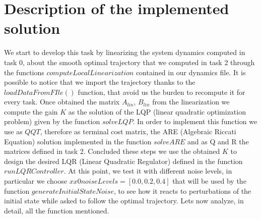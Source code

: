 \documentclass[a4paper,11pt,oneside]{book}
\begin{document}
\section{Description of the implemented solution}
\begin{justify}
    {We start to develop this task by linearizing the system dynamics computed in task 0, about the smooth optimal trajectory that we computed in task 2 through the functions $computeLocalLinearization$ contained in our dynamics file. It is possible to notice that we import the trajectory thanks to the $loadDataFromFIle()$ function, that avoid us the burden to recompute it for every task. Once obtained the matrix $A_{lin}$, $B_{lin}$ from the linearization we compute the gain $K$ as the solution of the LQP (linear quadratic optimization problem) given by the function $solveLQP$. In order to implement this function we use as $QQT$, therefore as terminal cost matrix, the ARE (Algebraic Riccati Equation) solution implemented in the function $solveARE$ and as Q and R the matrices defined in task 2. Concluded these steps we use the obtained $K$ to design the desired LQR (Linear Quadratic Regulator) defined in the function $runLQRController$. At this point, we test it with different noise levels, in particular we choose $xx0noiseLevels = [0.0, 0.2, 0.4]$ that will be used by the function $generateInitialStateNoise$, to see how it reacts to perturbations of the initial state while asked to follow the optimal trajectory. Let\textquotesingle s now analyze, in detail, all the function mentioned.}
\end{justify}
\end{document}
